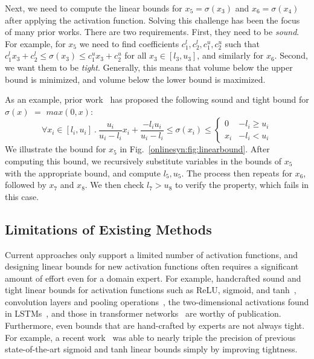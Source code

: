 Next, we need to compute the linear bounds for $ x_5 = \sigma(x_3) $ and $ x_6
= \sigma(x_4) $ after
applying the activation function. Solving this challenge has been the focus of
many prior works. There are two requirements. First, they need to be
\textit{sound}. For example, for $ x_5 $ we need to find coefficients $
c_1^l,c_2^l,c_1^u,c_2^u $ such that
$c_1^l x_3 + c_2^l
\leq \sigma(x_3) \leq c_1^ux_3 + c_2^u $ for all $x_3 \in [l_3, u_3]$, and similarly for $ x_6 $. Second, we
want them to be \textit{tight}. Generally, this means that volume below the
upper bound is minimized, and volume below the lower bound is maximized.


As an example, prior work~\cite{SinghGPV19,zhang2018efficient} has proposed the
following
sound and 	tight bound for $ \sigma(x) $  $ = $  $ max(0, x) $:
\[
	\forall x_i \in [l_i, u_i] ~.~ \frac{u_i}{u_i - l_i}x_i +
	\frac{-l_iu_i}{u_i-l_i} \leq \sigma(x_i)
	\leq \begin{cases}
	0 & -l_i \geq u_i\\
	x_i & -l_i < u_i
	\end{cases}
\]
We illustrate the bound for $ x_5 $ in Fig.~\ref{onlinesyn:fig:linearbound}. After
computing this bound, we recursively substitute variables in the
bounds of $ x_5 $ with the appropriate bound, and compute $ l_5, u_5 $. The
process then repeats for $ x_6 $, followed by $ x_7 $ and $ x_8 $. We then
check $ l_7 > u_8 $ to verify the property, which fails in this case.


\subsection{Limitations of Existing Methods}

Current approaches only support a limited number of activation functions, and
designing linear bounds for new activation functions often requires a
significant amount of effort even for a domain expert.
%
For example, handcrafted sound and
tight linear
bounds for activation functions such as ReLU, sigmoid, and
tanh~\cite{SinghGPV19,WengZCSHDBD18,zhang2018efficient,wu2021tightening,WangPWYJ18,WangPWYJ18nips},
convolution layers and pooling operations~\cite{boopathy2019cnn}, the
two-dimensional activations found in
LSTMs~\cite{ko2019popqorn,ryou2021scalable}, and those
 in transformer networks~\cite{shi2020robustness} are worthy of publication.
%
Furthermore, even bounds that are hand-crafted by experts are not always
tight. For example, a recent
work~\cite{wu2021tightening} was able to nearly triple the precision
of previous state-of-the-art sigmoid and tanh linear bounds simply by
improving tightness.

